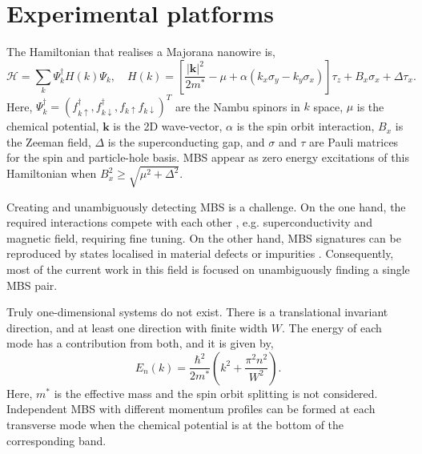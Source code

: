 \section{Experimental platforms}

The Hamiltonian that realises a Majorana nanowire \cite{Alicea2011} is,
\begin{equation}\label{eq:ham_maj}
\mathcal{H} = \sum_k \Psi_k^\dagger H(k) \Psi_k  ,\quad H(k) =  \left[ \frac{|\mathbf{k}|^2}{2 m^*} - \mu + \alpha(k_x \sigma_y - k_y \sigma_x) \right] \tau_z + B_x \sigma_x  + \Delta \tau_x.
\end{equation}
Here, $\Psi_k^\dagger = (f_{k\uparrow}^\dagger, f_{k\downarrow}^\dagger, f_{k\uparrow} f_{k\downarrow})^T$ are the Nambu spinors in $k$ space, $\mu$ is the chemical potential, $\mathbf{k}$ is the 2D wave-vector, $\alpha$ is the spin orbit interaction, $B_x$ is the Zeeman field, $\Delta$ is the superconducting gap, and $\sigma$ and $\tau$ are Pauli matrices for the spin and particle-hole basis.
MBS appear as zero energy excitations of this Hamiltonian when $B_x^2 \geq \sqrt{\mu^2 + \Delta^2}$.

Creating and unambiguously detecting MBS is a challenge.
On the one hand, the required interactions compete with each other \cite{Reeg2018}, e.g. superconductivity and magnetic field, requiring fine tuning.
On the other hand, MBS signatures can be reproduced by states localised in material defects or impurities \cite{Vuik2019,Liu2018}.
Consequently, most of the current work in this field is focused on unambiguously finding a single MBS pair.

Truly one-dimensional systems do not exist.
There is a translational invariant direction, and at least one direction with finite width $W$.
The energy of each mode has a contribution from both, and it is given by,
\begin{equation}
E_{n}(k) = \frac{\hbar^{2}}{2m^*} \left( k^{2} + \frac{\pi^{2} n^{2}}{W^{2}} \right).
\end{equation}
Here, $m^{*}$ is the effective mass and the spin orbit splitting is not considered.
Independent MBS with different momentum profiles can be formed at each transverse mode \cite{Lutchyn2010_2} when the chemical potential is at the bottom of the corresponding band.

